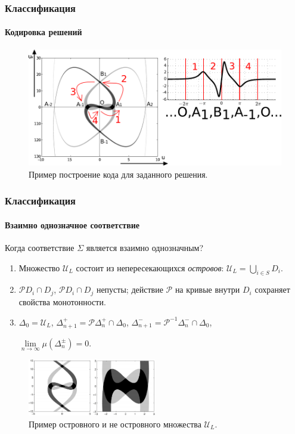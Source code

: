 \documentclass{beamer}
\begin{document}
\begin{frame}
	\frametitle{Классификация}
	\framesubtitle{Кодировка решений}
	
	\begin{figure}
		\includegraphics[width=1\textwidth]{pic/coding.pdf}
		\caption{Пример построение кода для заданного решения.}
		\label{pic:coding}
	\end{figure}
\end{frame}

\begin{frame}
	\frametitle{Классификация}
	\framesubtitle{Взаимно однозначное соответствие}
	
	Когда соответствие $\Sigma$ является взаимно однозначным?\footnotemark[3]
	\begin{enumerate}
		\item Множество $\mathcal{U}_L$ состоит из непересекающихся {\it островов}: $\mathcal{U}_L = \bigcup_{i \in S} D_i$.
		\item $\mathcal{P} D_i \cap D_j$, $\mathcal{P} D_i \cap D_j$ непусты; действие $\mathcal{P}$ на кривые внутри $D_i$ сохраняет свойства монотонности.
		\item $\Delta_0 = \mathcal{U}_L$, \quad $\Delta_{n + 1}^+ = \mathcal{P} \Delta_n^+ \cap \Delta_0$, \quad $\Delta_{n + 1}^- = \mathcal{P}^{-1} \Delta_n^- \cap \Delta_0$,\begin{center}
				$\lim \limits_{n \to \infty} \mu( \Delta_n^{\pm} ) = 0$.
			\end{center} 
	\end{enumerate}
	
	\begin{figure}
		\includegraphics[width=0.5\textwidth]{pic/islands.pdf}
		\caption{Пример островного и не островного множества $\mathcal{U}_{L}$.}
		\label{pic:coding}
	\end{figure}
	
\end{frame}
\end{document}
